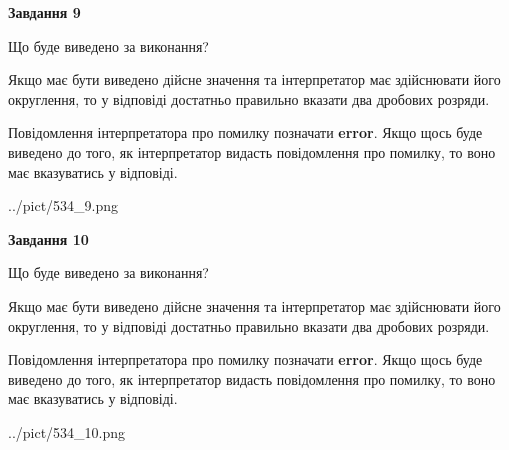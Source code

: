 \documentclass[12pt, ukrainian]{article}
\begin{document}
{\begin {Large}
{\begin {center}\textbf{Завдання 9}\end {center}}\par
Що буде виведено за виконання? \par

Якщо має бути виведено дійсне значення та інтерпретатор має здійснювати його округлення, 
то у відповіді достатньо правильно вказати два дробових розряди.

Повідомлення інтерпретатора про помилку позначати \textbf{error}.
Якщо щось буде виведено до того, як інтерпретатор видасть повідомлення про помилку, 
то воно має вказуватись у відповіді. \par

\begin{center}
	{../pict/534_9.png}
\end{center}
\newpage

{\begin {center}\textbf{Завдання 10}\end {center}}\par
Що буде виведено за виконання? \par

Якщо має бути виведено дійсне значення та інтерпретатор має здійснювати його округлення, 
то у відповіді достатньо правильно вказати два дробових розряди.

Повідомлення інтерпретатора про помилку позначати \textbf{error}.
Якщо щось буде виведено до того, як інтерпретатор видасть повідомлення про помилку, 
то воно має вказуватись у відповіді. \par

\begin{center}
	{../pict/534_10.png}
\end{center}
\newpage

\end {Large}}
\end{document}
